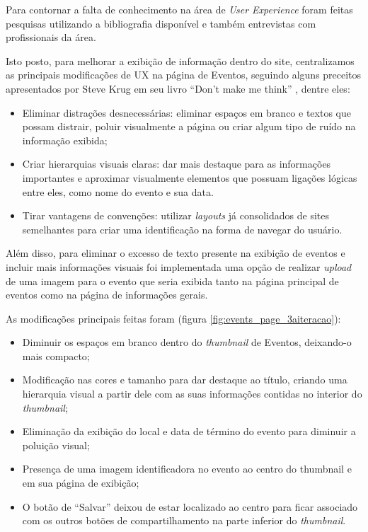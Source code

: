 \par Para contornar a falta de conhecimento na área de \emph{User Experience} foram feitas pesquisas utilizando a bibliografia disponível e também entrevistas com profissionais da área. 
\par Isto posto, para melhorar a exibição de informação dentro do site, centralizamos as principais modificações de UX na página de Eventos, seguindo alguns preceitos apresentados por Steve Krug em seu livro ``Don't make me think'' \citep{krug:00}, dentre eles:
	\begin{itemize}
	\item Eliminar distrações desnecessárias: eliminar espaços em branco e textos que possam distrair, poluir visualmente a página ou criar algum tipo de ruído na informação exibida;
	\item Criar hierarquias visuais claras: dar mais destaque para as informações importantes e aproximar visualmente elementos que possuam ligações lógicas entre eles, como nome do evento e sua data.
	\item Tirar vantagens de convenções: utilizar \emph{layouts} já consolidados de sites semelhantes para criar uma identificação na forma de navegar do usuário.
\end{itemize}
	\par Além disso, para eliminar o excesso de texto presente na exibição de eventos e incluir mais informações visuais foi implementada uma opção de realizar \emph{upload} de uma imagem para o evento que seria exibida tanto na página principal de eventos como na página de informações gerais.
\par As modificações principais feitas foram (figura \ref{fig:events_page_3aiteracao}):
\begin{itemize}
\item Diminuir os espaços em branco dentro do \emph{thumbnail} de Eventos, deixando-o mais compacto;
\item Modificação nas cores e tamanho para dar destaque ao título, criando uma hierarquia visual a partir dele com as suas informações contidas no interior do \emph{thumbnail};
\item Eliminação da exibição do local e data de término do evento para diminuir a poluição visual;
\item Presença de uma imagem identificadora no evento ao centro do thumbnail e em sua página de exibição;
\item O botão de ``Salvar'' deixou de estar localizado ao centro para ficar associado com os outros botões de compartilhamento na parte inferior do \emph{thumbnail}.
\end{itemize}
